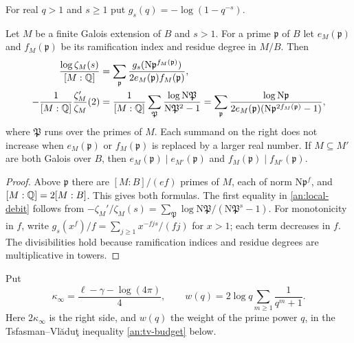 For real $q>1$ and $s\ge1$ put $g_s(q)=-\log(1-q^{-s})$.

\begin{lemma}\label{an:local-contribution}
Let $M$ be a finite Galois extension of $B$ and $s>1$. For a prime
$\mathfrak p$ of $B$ let $e_M(\mathfrak p)$ and $f_M(\mathfrak p)$ be its
ramification index and residue degree in $M/B$. Then
\begin{align}
 \frac{\log\zeta_M(s)}{[M:\mathbb Q]}
 &=\sum_{\mathfrak p}\frac{g_s(\mathrm N\mathfrak p^{f_M(\mathfrak p)})}
 {2e_M(\mathfrak p)f_M(\mathfrak p)},\label{an:local-sum}\\
 -\frac1{[M:\mathbb Q]}\frac{\zeta_M'}{\zeta_M}(2)
 &=\frac1{[M:\mathbb Q]}\sum_{\mathfrak P}\frac{\log\mathrm N\mathfrak P}
 {\mathrm N\mathfrak P^2-1}
 =\sum_{\mathfrak p}\frac{\log\mathrm N\mathfrak p}
 {2e_M(\mathfrak p)(\mathrm N\mathfrak p^{2f_M(\mathfrak p)}-1)},
 \label{an:local-debit}
\end{align}
where $\mathfrak P$ runs over the primes of $M$. Each summand on the right
does not increase when $e_M(\mathfrak p)$ or $f_M(\mathfrak p)$ is replaced
by a larger real number. If $M\subseteq M'$ are both Galois over $B$, then
$e_M(\mathfrak p)\mid e_{M'}(\mathfrak p)$ and
$f_M(\mathfrak p)\mid f_{M'}(\mathfrak p)$.
\end{lemma}

\begin{proof}
Above $\mathfrak p$ there are $[M:B]/(ef)$ primes of $M$, each of norm
$\mathrm N\mathfrak p^f$, and $[M:\mathbb Q]=2[M:B]$. This gives both formulas.
The first equality in \eqref{an:local-debit} follows from
$-\zeta_M'/\zeta_M(s)=\sum_{\mathfrak P}\log\mathrm N\mathfrak P/(\mathrm
N\mathfrak P^s-1)$. For monotonicity in $f$, write
$g_s(x^f)/f=\sum_{j\ge1}x^{-fjs}/(fj)$ for $x>1$; each term decreases in
$f$. The divisibilities hold because ramification indices and residue
degrees are multiplicative in towers.
\end{proof}

Put
\[
 \kappa_\infty=\frac{\ell-\gamma-\log(4\pi)}4,\qquad
 w(q)=2\log q\sum_{m\ge1}\frac1{q^m+1}.
\]
Here $2\kappa_\infty$ is the right side, and $w(q)$ the weight of the prime
power $q$, in the Tsfasman--Vl\u{a}du\c{t} inequality \eqref{an:tv-budget}
below.


